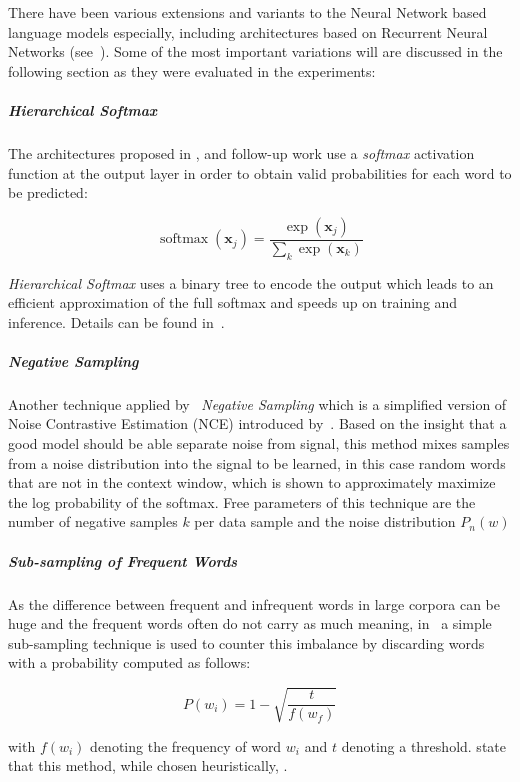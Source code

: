 There have been various extensions and variants to the Neural Network based language models especially, including architectures based on Recurrent Neural Networks (see~\cite{Mikolov:2012aa}). Some of the most important variations will are discussed in the following section as they were evaluated in the experiments:

\subparagraph{Hierarchical Softmax}
The architectures proposed in \cite{Bengio:2000aa}, \cite{bengio2003neural} and follow-up work use a \emph{softmax} activation function at the output layer in order to obtain valid probabilities for each word to be predicted:

\begin{equation}
  \operatorname{softmax}(\mathbf{x}_j) = \frac{\exp(\mathbf{x}_j)}{\sum_k \exp(\mathbf{x}_k)}
\end{equation}

\emph{Hierarchical Softmax} uses a binary tree to encode the output which leads to an efficient approximation of the full softmax and speeds up on training and inference. Details can be found in~\cite{Mikolov:2013ab}.

\subparagraph{Negative Sampling}
Another technique applied by~\cite{Mikolov:2013ab} \emph{Negative Sampling} which is a simplified version of Noise Contrastive Estimation (NCE) introduced by~\cite{Gutmann:2012aa}. Based on the insight that a good model should be able separate noise from signal, this method mixes samples from a noise distribution into the signal to be learned, in this case random words that are not in the context window, which is shown to approximately maximize the log probability of the softmax. Free parameters of this technique are the number of negative samples $k$ per data sample and the noise distribution $P_n(w)$

\subparagraph{Sub-sampling of Frequent Words}
As the difference between frequent and infrequent words in large corpora can be huge and the frequent words often do not carry as much meaning, in~\cite{Mikolov:2013ab} a simple sub-sampling technique is used to counter this imbalance by discarding words with a probability computed as follows:

\begin{equation}
  P(w_i) = 1 - \sqrt{\frac{t}{f(w_f)}}
\end{equation}

with $f(w_i)$ denoting the frequency of word $w_i$ and $t$ denoting a threshold. \cite{Mikolov:2013ab} state that this method, while chosen heuristically, .

